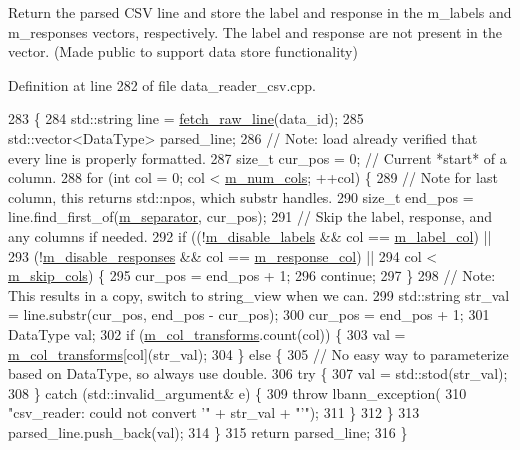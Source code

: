 Return the parsed C\+SV line and store the label and response in the m\+\_\+labels and m\+\_\+responses vectors, respectively. The label and response are not present in the vector. (Made public to support data store functionality) 

Definition at line 282 of file data\+\_\+reader\+\_\+csv.\+cpp.


\begin{DoxyCode}
283                \{
284   std::string line = \hyperlink{classlbann_1_1csv__reader_a8ea8669ec6c85de8d4127da7bb47d135}{fetch\_raw\_line}(data\_id);
285   std::vector<DataType> parsed\_line;
286   \textcolor{comment}{// Note: load already verified that every line is properly formatted.}
287   \textcolor{keywordtype}{size\_t} cur\_pos = 0;  \textcolor{comment}{// Current *start* of a column.}
288   \textcolor{keywordflow}{for} (\textcolor{keywordtype}{int} col = 0; col < \hyperlink{classlbann_1_1csv__reader_a7607d3f6b356538671147a0b8f7b09c8}{m\_num\_cols}; ++col) \{
289     \textcolor{comment}{// Note for last column, this returns std::npos, which substr handles.}
290     \textcolor{keywordtype}{size\_t} end\_pos = line.find\_first\_of(\hyperlink{classlbann_1_1csv__reader_abab4a731daa751856f083c117ac8862a}{m\_separator}, cur\_pos);
291     \textcolor{comment}{// Skip the label, response, and any columns if needed.}
292     \textcolor{keywordflow}{if} ((!\hyperlink{classlbann_1_1csv__reader_a5f013485fc1466dcf1f78ef020b845d4}{m\_disable\_labels} && col == \hyperlink{classlbann_1_1csv__reader_acc02e56c81421c4507f7178ca8461b04}{m\_label\_col}) ||
293         (!\hyperlink{classlbann_1_1csv__reader_a1e133c3585df5f131b4772f618e77ad2}{m\_disable\_responses} && col == \hyperlink{classlbann_1_1csv__reader_a1cfa3562ecd0a7f6358290f299de5812}{m\_response\_col}) ||
294         col < \hyperlink{classlbann_1_1csv__reader_a3a6cb698fbeb4abd0032e2b018bbb326}{m\_skip\_cols}) \{
295       cur\_pos = end\_pos + 1;
296       \textcolor{keywordflow}{continue};
297     \}
298     \textcolor{comment}{// Note: This results in a copy, switch to string\_view when we can.}
299     std::string str\_val = line.substr(cur\_pos, end\_pos - cur\_pos);
300     cur\_pos = end\_pos + 1;
301     DataType val;
302     \textcolor{keywordflow}{if} (\hyperlink{classlbann_1_1csv__reader_aad98a20225b1f2545de32b4c19c8285b}{m\_col\_transforms}.count(col)) \{
303       val = \hyperlink{classlbann_1_1csv__reader_aad98a20225b1f2545de32b4c19c8285b}{m\_col\_transforms}[col](str\_val);
304     \} \textcolor{keywordflow}{else} \{
305       \textcolor{comment}{// No easy way to parameterize based on DataType, so always use double.}
306       \textcolor{keywordflow}{try} \{
307         val = std::stod(str\_val);
308       \} \textcolor{keywordflow}{catch} (std::invalid\_argument& e) \{
309         \textcolor{keywordflow}{throw} lbann\_exception(
310           \textcolor{stringliteral}{"csv\_reader: could not convert '"} + str\_val + \textcolor{stringliteral}{"'"});
311       \}
312     \}
313     parsed\_line.push\_back(val);
314   \}
315   \textcolor{keywordflow}{return} parsed\_line;
316 \}
\end{DoxyCode}
